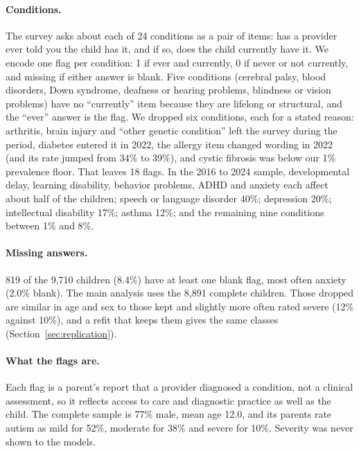 \paragraph{Conditions.}
The survey asks about each of 24 conditions as a pair of items: has a provider ever told you the child has it, and if so, does the child currently have it. We encode one flag per condition: 1 if ever and currently, 0 if never or not currently, and missing if either answer is blank. Five conditions (cerebral palsy, blood disorders, Down syndrome, deafness or hearing problems, blindness or vision problems) have no ``currently'' item because they are lifelong or structural, and the ``ever'' answer is the flag. We dropped six conditions, each for a stated reason: arthritis, brain injury and ``other genetic condition'' left the survey during the period, diabetes entered it in 2022, the allergy item changed wording in 2022 (and its rate jumped from 34\% to 39\%), and cystic fibrosis was below our 1\% prevalence floor. That leaves 18 flags. In the 2016 to 2024 sample, developmental delay, learning disability, behavior problems, ADHD and anxiety each affect about half of the children; speech or language disorder 40\%; depression 20\%; intellectual disability 17\%; asthma 12\%; and the remaining nine conditions between 1\% and 8\%.

\paragraph{Missing answers.}
819 of the 9,710 children (8.4\%) have at least one blank flag, most often anxiety (2.0\% blank). The main analysis uses the 8,891 complete children. Those dropped are similar in age and sex to those kept and slightly more often rated severe (12\% against 10\%), and a refit that keeps them gives the same classes (Section~\ref{sec:replication}).

\paragraph{What the flags are.}
Each flag is a parent's report that a provider diagnosed a condition, not a clinical assessment, so it reflects access to care and diagnostic practice as well as the child. The complete sample is 77\% male, mean age 12.0, and its parents rate autism as mild for 52\%, moderate for 38\% and severe for 10\%. Severity was never shown to the models.
